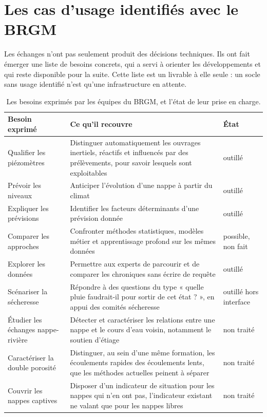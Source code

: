 \section{Les cas d'usage identifiés avec le BRGM}

Les échanges n'ont pas seulement produit des décisions techniques. Ils ont fait émerger une
liste de besoins concrets, qui a servi à orienter les développements et qui reste disponible
pour la suite. Cette liste est un livrable à elle seule : un socle sans usage identifié n'est qu'une
infrastructure en attente.

\begin{table}[H]
\centering
\caption{Les besoins exprimés par les équipes du BRGM, et l'état de leur prise en charge.}
\label{tab:besoins-brgm}
\begin{tabularx}{\textwidth}{@{}L{3.3cm}Yl@{}}
\toprule
\textbf{Besoin exprimé} & \textbf{Ce qu'il recouvre} & \textbf{État} \\
\midrule
Qualifier les piézomètres & Distinguer automatiquement les ouvrages inertiels, réactifs et
influencés par des prélèvements, pour savoir lesquels sont exploitables & outillé \\
Prévoir les niveaux & Anticiper l'évolution d'une nappe à partir du climat & outillé \\
Expliquer les prévisions & Identifier les facteurs déterminants d'une prévision donnée &
outillé \\
Comparer les approches & Confronter méthodes statistiques, modèles métier et apprentissage
profond sur les mêmes données & possible, non fait \\
Explorer les données & Permettre aux experts de parcourir et de comparer les chroniques sans
écrire de requête & outillé \\
Scénariser la sécheresse & Répondre à des questions du type « quelle pluie faudrait-il pour
sortir de cet état ? », en appui des comités sécheresse & outillé hors interface \\
Étudier les échanges nappe-rivière & Détecter et caractériser les relations entre une nappe et
le cours d'eau voisin, notamment le soutien d'étiage & non traité \\
Caractériser la double porosité & Distinguer, au sein d'une même formation, les écoulements
rapides des écoulements lents, que les méthodes actuelles peinent à séparer & non traité \\
Couvrir les nappes captives & Disposer d'un indicateur de situation pour les nappes qui n'en ont
pas, l'indicateur existant ne valant que pour les nappes libres & non traité \\
\bottomrule
\end{tabularx}
\end{table}

